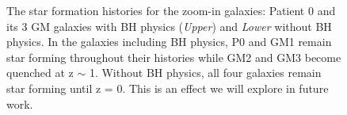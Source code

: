 \documentclass[]{emulateapj}
\begin{document}
\begin{figure}[h!]
\centerline{}
\vspace{-1mm}
\centerline{}
\caption[]{The star formation histories for the zoom-in galaxies: Patient 0 and its 3 GM galaxies with BH physics (\textit{Upper}) and \textit{Lower} without BH physics. In the galaxies including BH physics, P0 and GM1 remain star forming throughout their histories while GM2 and GM3 become quenched at z $\sim$ 1. Without BH physics, all four galaxies remain star forming until z = 0. This is an effect we will explore in future work.}
\label{sfh}
\end{figure}
\end{document}
